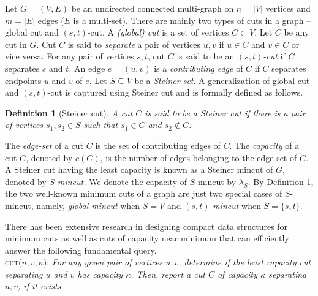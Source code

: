 \documentclass[letterpaper,11pt]{article}
\newtheorem{definition}{Definition}[]
\begin{document}
Let $G=(V,E)$ be an undirected connected multi-graph on $n=|V|$ vertices and $m=|E|$ edges ($E$ is a multi-set). There are mainly two types of cuts in a graph -- global cut and $(s,t)$-cut. 
A \textit{(global) cut} is a set of vertices $C\subset V$. Let $C$ be any cut in $G$. Cut $C$ is said to \textit{separate} a pair of vertices $u,v$ if $u\in C$ and $v\in \overline{C}$ or vice versa. For any pair of vertices $s,t$, cut $C$ is said to be an \textit{$(s,t)$-cut} if $C$ separates $s$ and $t$. An edge $e=(u,v)$ is a \textit{contributing edge} of $C$ if $C$ separates endpoints $u$ and $v$ of $e$.
Let $S\subseteq V$ be a \textit{Steiner set}. A generalization of global cut and $(s,t)$-cut is captured using Steiner cut and is formally defined as follows.
\begin{definition} [Steiner cut] \label{def : steiner cut}
    A cut $C$ is said to be a Steiner cut if there is a pair of vertices $s_1,s_2\in S$ such that $s_1\in C$ and $s_2\notin C$.
\end{definition}
The \textit{edge-set} of a cut $C$ is the set of contributing edges of $C$. The \textit{capacity} of a cut $C$, denoted by $c(C)$, is the number of edges belonging to the edge-set of $C$. A Steiner cut having the least capacity is known as a Steiner mincut of $G$, denoted by {\em $S$-mincut.} We denote the capacity of $S$-mincut by $\lambda_S$.  
By Definition \ref{def : steiner cut}, the two well-known minimum cuts of a graph are just two special cases of $S$-mincut, namely, \textit{global mincut} when $S=V$ and $(s,t)$-\textit{mincut} when $S=\{s,t\}$. 





There has been extensive research in designing compact data structures for minimum cuts \cite{gomory1961multi, dinitz1976structure, DBLP:journals/mp/PicardQ80, DBLP:journals/jacm/KawarabayashiT19, DBLP:journals/anor/ChengH91} as well as cuts of capacity near minimum \cite{DBLP:conf/stoc/DinitzN95, DBLP:conf/focs/Benczur95, DBLP:journals/jacm/KawarabayashiT19, DBLP:journals/talg/BaswanaBP23} that can efficiently answer the following fundamental query. \\ 

\noindent
   \textsc{cut($u,v, \kappa$)}: \textit{For any given pair of vertices $u,v$, determine if the least capacity cut separating $u$ and $v$ has capacity $\kappa$. Then, report a cut $C$ of capacity $\kappa$ separating $u,v$, if it exists.}\\
\end{document}
